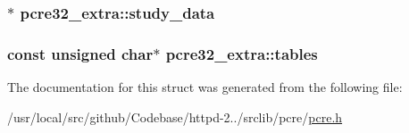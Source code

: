 \subsubsection[{\texorpdfstring{study\+\_\+data}{study_data}}]{$\ast$ pcre32\+\_\+extra\+::study\+\_\+data}\hypertarget{structpcre32__extra_ae1b1101191398f67e49484c786d7d884}{}\label{structpcre32__extra_ae1b1101191398f67e49484c786d7d884}
\subsubsection[{\texorpdfstring{tables}{tables}}]{\setlength{\rightskip}{0pt plus 5cm}const unsigned char$\ast$ pcre32\+\_\+extra\+::tables}\hypertarget{structpcre32__extra_ae0db073839dce942e0e54b9de6a0dcbf}{}\label{structpcre32__extra_ae0db073839dce942e0e54b9de6a0dcbf}


The documentation for this struct was generated from the following file\+:\begin{DoxyCompactItemize}
\item 
/usr/local/src/github/\+Codebase/httpd-\/2../srclib/pcre/\hyperlink{pcre_8h}{pcre.\+h}\end{DoxyCompactItemize}

